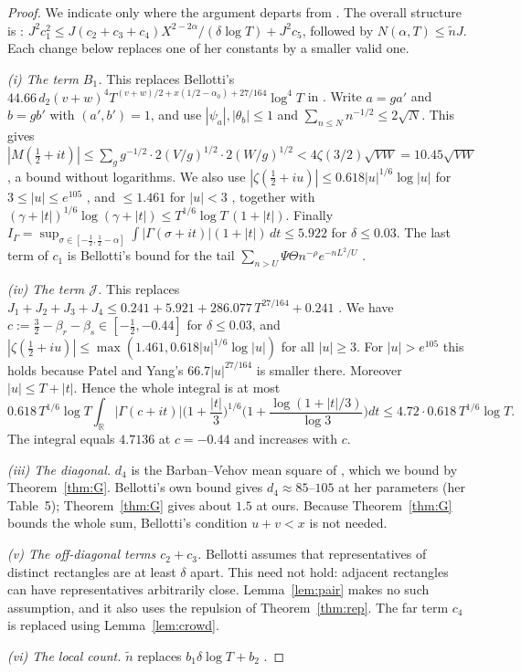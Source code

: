 \begin{proof}
We indicate only where the argument departs from \cite{Bellotti}.
The overall structure is \cite[(4.22)--(4.23)]{Bellotti}: $J^2c_1^2 \le J(c_2+c_3+c_4)X^{2-2\alpha}/(\delta\log T) + J^2c_5$, followed by $N(\alpha,T) \le \tilde nJ$.
Each change below replaces one of her constants by a smaller valid one.

\emph{(i) The term $B_1$.}
This replaces Bellotti's $44.66\,d_2(v+w)^4T^{(v+w)/2+x(1/2-\alpha_0)+27/164}\log^4T$ in \cite[(3.17)]{Bellotti}.
Write $a = ga'$ and $b = gb'$ with $(a',b') = 1$, and use $|\psi_a|, |\theta_b| \le 1$ and $\sum_{n\le N}n^{-1/2}\le 2\sqrt N$.
This gives
$|M(\tfrac12+it)| \le \sum_g g^{-1/2}\cdot 2(V/g)^{1/2}\cdot 2(W/g)^{1/2} < 4\zeta(3/2)\sqrt{VW} = 10.45\sqrt{VW}$,
a bound without logarithms.
We also use $|\zeta(\frac12+iu)| \le 0.618|u|^{1/6}\log|u|$ for $3 \le |u| \le e^{105}$ \cite{HPY}, and $\le 1.461$ for $|u| < 3$ \cite{Hiary}, together with
$(\gamma+|t|)^{1/6}\log(\gamma+|t|) \le T^{1/6}\log T\,(1+|t|)$.
Finally $I_\Gamma = \sup_{\sigma\in[-\frac12,\frac12-\alpha]}\int|\Gamma(\sigma+it)|(1+|t|)\,dt \le 5.922$ for $\delta \le 0.03$.
The last term of $c_1$ is Bellotti's bound for the tail $\sum_{n>U}\Psi\Theta n^{-\rho}e^{-nL^2/U}$ \cite[(3.19)ff.]{Bellotti}.

\emph{(iv) The term $\mathcal J$.}
This replaces $J_1+J_2+J_3+J_4 \le 0.241 + 5.921 + 286.077\,T^{27/164} + 0.241$ \cite[(4.17)--(4.19)]{Bellotti}.
We have $c := \frac32 - \beta_r - \beta_s \in [-\frac12, -0.44]$ for $\delta\le0.03$, and $|\zeta(\frac12 + iu)| \le \max(1.461, 0.618|u|^{1/6}\log|u|)$ for all $|u|\ge3$.
For $|u| > e^{105}$ this holds because Patel and Yang's $66.7|u|^{27/164}$ \cite{PY} is smaller there.
Moreover $|u| \le T + |t|$.
Hence the whole integral \cite[(4.16)]{Bellotti} is at most
\[
0.618\,T^{1/6}\log T\int_{\mathbb R}|\Gamma(c+it)|\Big(1+\frac{|t|}3\Big)^{1/6}\Big(1 + \frac{\log(1+|t|/3)}{\log3}\Big)dt \le 4.72\cdot 0.618\,T^{1/6}\log T .
\]
The integral equals $4.7136$ at $c = -0.44$ and increases with $c$.

\emph{(iii) The diagonal.} $d_4$ is the Barban--Vehov mean square of \cite[Lemma~4.2]{Bellotti}, which we bound by Theorem~\ref{thm:G}.
Bellotti's own bound \cite[Lemma~3.3, (3.6)]{Bellotti} gives $d_4 \approx 85$--$105$ at her parameters (her Table~5); Theorem~\ref{thm:G} gives about $1.5$ at ours.
Because Theorem~\ref{thm:G} bounds the whole sum, Bellotti's condition $u+v<x$ is not needed.

\emph{(v) The off-diagonal terms $c_2+c_3$.}
Bellotti assumes \cite[(4.11)]{Bellotti} that representatives of distinct rectangles are at least $\delta$ apart.
This need not hold: adjacent rectangles can have representatives arbitrarily close.
Lemma~\ref{lem:pair} makes no such assumption, and it also uses the repulsion of Theorem~\ref{thm:rep}.
The far term $c_4$ is replaced using Lemma~\ref{lem:crowd}.

\emph{(vi) The local count.} $\tilde n$ replaces $b_1\delta\log T + b_2$ \cite[Lemma~2.4]{Bellotti}.
\end{proof}

